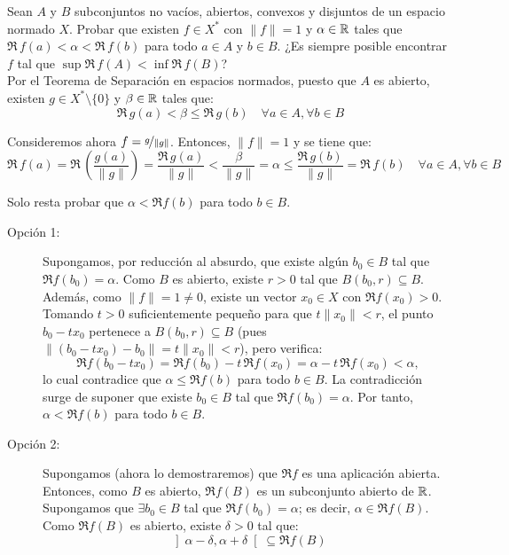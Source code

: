 \begin{ejercicio}
    Sean $A$ y $B$ subconjuntos no vacíos, abiertos, convexos y disjuntos de un espacio normado $X$. Probar que existen $f \in X^*$ con $\|f\| = 1$ y $\alpha \in \mathbb{R}$ tales que $\Re\,f(a) < \alpha < \Re\,f(b)$ para todo $a \in A$ y $b \in B$. ¿Es siempre posible encontrar $f$ tal que $\sup \Re\,f(A) < \inf \Re\,f(B)$?\\

    Por el Teorema de Separación en espacios normados, puesto que $A$ es abierto, existen $g \in X^*\setminus\{0\}$ y $\beta \in \mathbb{R}$ tales que:
    \begin{equation*}
        \Re\,g(a) < \beta \leq \Re\,g(b) \quad \forall a \in A, \forall b \in B
    \end{equation*}

    Consideremos ahora $f = \nicefrac{g}{\|g\|}$. Entonces, $\|f\| = 1$ y se tiene que:
    \begin{equation*}
        \Re\,f(a) = \Re\,\left(\dfrac{g(a)}{\|g\|}\right) = \dfrac{\Re\,g(a)}{\|g\|} < \dfrac{\beta}{\|g\|} = \alpha \leq \dfrac{\Re\,g(b)}{\|g\|} = \Re\,f(b) \quad \forall a \in A, \forall b \in B
    \end{equation*}

    Solo resta probar que $\alpha < \Re f(b)$ para todo $b \in B$.
    \begin{description}
        \item[Opción 1:] Supongamos, por reducción al absurdo, que existe algún $b_0 \in B$ tal que $\Re f(b_0) = \alpha$. Como $B$ es abierto, existe $r > 0$ tal que $B(b_0, r) \subseteq B$. Además, como $\|f\| = 1 \neq 0$, existe un vector $x_0 \in X$ con $\Re f(x_0) > 0$. Tomando $t > 0$ suficientemente pequeño para que $t\|x_0\| < r$, el punto $b_0 - t x_0$ pertenece a $B(b_0, r) \subseteq B$ (pues $\|(b_0 - t x_0) - b_0\| = t\|x_0\| < r$), pero verifica:
        \[
            \Re f(b_0 - t x_0) = \Re f(b_0) - t\,\Re f(x_0) = \alpha - t\,\Re f(x_0) < \alpha,
        \]
        lo cual contradice que $\alpha \leqslant \Re f(b)$ para todo $b \in B$. La contradicción surge de suponer que existe $b_0 \in B$ tal que $\Re f(b_0) = \alpha$. Por tanto, $\alpha < \Re f(b)$ para todo $b \in B$.

        \item[Opción 2:] Supongamos (ahora lo demostraremos) que $\Re f$ es una aplicación abierta. Entonces, como $B$ es abierto, $\Re f(B)$ es un subconjunto abierto de $\mathbb{R}$. Supongamos que $\exists b_0 \in B$ tal que $\Re f(b_0) = \alpha$; es decir, $\alpha \in \Re f(B)$. Como $\Re f(B)$ es abierto, existe $\delta > 0$ tal que:
        \begin{equation*}
            \left]\alpha - \delta, \alpha + \delta\right[ \subseteq \Re f(B)
        \end{equation*}


\end{description}
\end{ejercicio}
